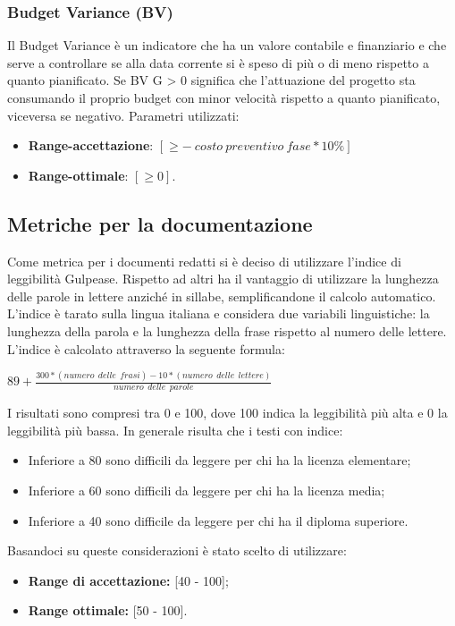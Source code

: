 \subsubsection{Budget Variance (BV)}
Il Budget Variance è un indicatore che ha un valore contabile e finanziario e che serve a controllare se alla data corrente si è speso di più o di meno rispetto a quanto pianificato.
Se BV G > 0 significa che l'attuazione del progetto sta consumando il proprio budget con minor velocità rispetto a quanto pianificato, viceversa se negativo.
Parametri utilizzati:
\begin{itemize}
	\item \textbf{Range-accettazione}: $\left[  \geq - \: costo \: preventivo \: fase * 10 \% \right]$
	\item \textbf{Range-ottimale}: $\left[\geq 0\right]$.
\end{itemize}

\subsection{Metriche per la documentazione}
\label{sezione 3.8}
Come metrica per i documenti redatti si è deciso di utilizzare l'indice di leggibilità \gls{Gulpease}. Rispetto ad altri ha il vantaggio di utilizzare la lunghezza delle parole in lettere anziché in sillabe, semplificandone il calcolo automatico. L'indice è tarato sulla lingua italiana e considera due variabili linguistiche: la lunghezza della parola e la lunghezza della frase rispetto al numero delle lettere. \\
\noindent L'indice è calcolato attraverso la seguente formula:\\
\begin{center}
	$89+ \frac{300*\left(numero\:\ delle\:\ frasi \right)-10*\left(numero\:\ delle\:\ lettere\right)}{numero\:\ delle\:\ parole}$
\end{center}
I risultati sono compresi tra 0 e 100, dove 100 indica la leggibilità più alta e 0 la leggibilità più bassa. In generale risulta che i testi con indice:
\begin{itemize}
	\item Inferiore a 80 sono difficili da leggere per chi ha la licenza elementare;
	\item Inferiore a 60 sono difficili da leggere per chi ha la licenza media;
	\item Inferiore a 40 sono difficile da leggere per chi ha il diploma superiore.
\end{itemize}
Basandoci su queste considerazioni è stato scelto di utilizzare:
\begin{itemize}
	\item \textbf{Range di accettazione:} [40 - 100];
	\item \textbf{Range ottimale:} [50 - 100].
\end{itemize}
	
